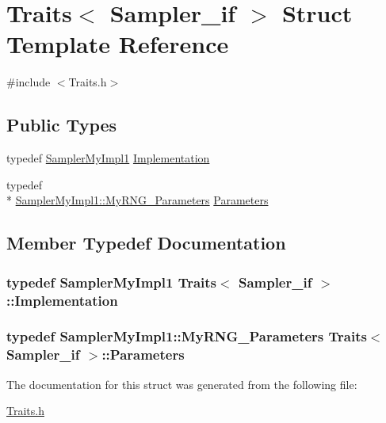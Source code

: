 \hypertarget{struct_traits_3_01_sampler__if_01_4}{\section{Traits$<$ Sampler\-\_\-if $>$ Struct Template Reference}
\label{struct_traits_3_01_sampler__if_01_4}
}


{\ttfamily \#include $<$Traits.\-h$>$}

\subsection*{Public Types}
\begin{DoxyCompactItemize}
\item 
typedef \hyperlink{class_sampler_my_impl1}{Sampler\-My\-Impl1} \hyperlink{struct_traits_3_01_sampler__if_01_4_aabc4648655c0f3f075ddf4c2a8ca0140}{Implementation}
\item 
typedef \\*
\hyperlink{class_sampler_my_impl1_1_1_my_r_n_g___parameters}{Sampler\-My\-Impl1\-::\-My\-R\-N\-G\-\_\-\-Parameters} \hyperlink{struct_traits_3_01_sampler__if_01_4_a4ad2f3625d3d6fc6cfb35de363d5594e}{Parameters}
\end{DoxyCompactItemize}


\subsection{Member Typedef Documentation}
\hypertarget{struct_traits_3_01_sampler__if_01_4_aabc4648655c0f3f075ddf4c2a8ca0140}{
\subsubsection[{Implementation}]{\setlength{\rightskip}{0pt plus 5cm}typedef {\bf Sampler\-My\-Impl1} {\bf Traits}$<$ {\bf Sampler\-\_\-if} $>$\-::{\bf Implementation}}}\label{struct_traits_3_01_sampler__if_01_4_aabc4648655c0f3f075ddf4c2a8ca0140}
\hypertarget{struct_traits_3_01_sampler__if_01_4_a4ad2f3625d3d6fc6cfb35de363d5594e}{
\subsubsection[{Parameters}]{\setlength{\rightskip}{0pt plus 5cm}typedef {\bf Sampler\-My\-Impl1\-::\-My\-R\-N\-G\-\_\-\-Parameters} {\bf Traits}$<$ {\bf Sampler\-\_\-if} $>$\-::{\bf Parameters}}}\label{struct_traits_3_01_sampler__if_01_4_a4ad2f3625d3d6fc6cfb35de363d5594e}


The documentation for this struct was generated from the following file\-:\begin{DoxyCompactItemize}
\item 
\hyperlink{_traits_8h}{Traits.\-h}\end{DoxyCompactItemize}
